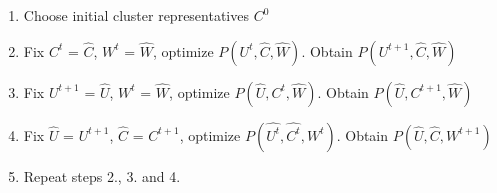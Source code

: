 \documentclass[../report.tex]{subfiles}
\begin{document}
\begin{enumerate}
  \item Choose initial cluster representatives $C^0$
  \item Fix $C^t$ = $\hat{C}$, $W^t$ = $\hat{W}$, optimize $P(U^{t}, \hat{ C }, \hat{W})$. Obtain $P(U^{t + 1}, \hat{ C }, \hat{W})$
  \item Fix $U^{t + 1}$ = $\hat{U}$, $W^t$ = $\hat{W}$, optimize $P(\hat{U}, C^t, \hat{W})$. Obtain $P(\hat{ U }, C^{t + 1}, \hat{W})$
  \item Fix $\hat{U}$ = $U^{t+1}$, $\hat{C}$ = $C^{t+1}$, optimize $P(\hat{U^{t}}, \hat{ C^{t} }, W^{t})$. Obtain $P(\hat{U}, \hat{ C }, W^{t + 1})$
  \item Repeat steps 2., 3. and 4.
\end{enumerate}


\end{document}
